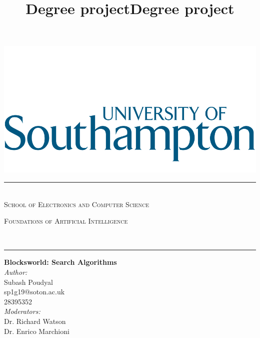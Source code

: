 \documentclass[10pt]{article}
\title{Degree project}
\title{Degree project}
\begin{document}

\thispagestyle{firststyle}
\begin{center}
  \begin{minipage}{0.48\textwidth} \begin{center}
      \includegraphics[scale = 0.95]{images/default-logo.png}
  \end{center}
    
\end{minipage}
  \vspace*{3cm}
  \vspace*{1cm}
  
\rule{\linewidth}{0.9pt}  \\[1.4cm]
\vspace*{-1cm}
  \textsc{\LARGE School of Electronics and Computer Science}\\[1.5cm]

  \begin{minipage}{0.9\textwidth} 
    \begin{center}
      \textsc{\LARGE Foundations of Artificial Intelligence}
    \end{center}
  \end{minipage}\\[0.5cm]
  \rule{\linewidth}{0.9pt} 
  \vspace*{1cm}

  { \huge \bfseries Blocksworld: Search Algorithms}\\[0.4cm]	
  \vspace*{2cm}
  { \large 
    \emph{Author:} \\	
      Subash Poudyal \\
      sp1g19@soton.ac.uk \\
      28395352 \\
    \vspace*{1.5cm}
    \emph{Moderators:} \\													  
      Dr. Richard Watson \\
      Dr. Enrico Marchioni	\\
  }


  \vspace{3cm} 	

  
\end{center}
																		
\end{document}
